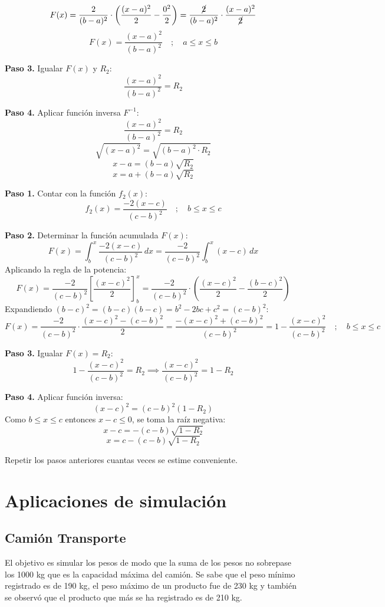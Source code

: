 \documentclass{article}
\begin{document}
\begin{description}
    $$ F(x) = \frac{2}{(b-a)^2} \cdot \left( \frac{(x-a)^2}{2} - \frac{0^2}{2} \right) = \frac{\cancel{2}}{(b-a)^2} \cdot \frac{(x-a)^2}{\cancel{2}} $$
    $$ F(x) = \frac{(x-a)^2}{(b-a)^2} \quad ; \quad a \leq x \leq b $$

    \textbf{Paso 3.} Igualar $F(x)$ y $R_2$:
    $$ \frac{(x-a)^2}{(b-a)^2} = R_2 $$

    \textbf{Paso 4.} Aplicar función inversa $F^{-1}$:
    $$ \frac{(x-a)^2}{(b-a)^2} = R_2 $$
    $$ \sqrt{(x-a)^2} = \sqrt{(b-a)^2 \cdot R_2} $$
    $$ x - a = (b-a)\sqrt{R_2} $$
    $$ \boxed{x = a + (b-a)\sqrt{R_2}} $$

    \textbf{Paso 1.} Contar con la función $f_2(x)$:
    $$ f_2(x) = \frac{-2(x-c)}{(c-b)^2} \quad ; \quad b \leq x \leq c $$

    \textbf{Paso 2.} Determinar la función acumulada $F(x)$:
    $$ F(x) = \int_b^x \frac{-2(x-c)}{(c-b)^2}\,dx = \frac{-2}{(c-b)^2} \int_b^x (x-c)\,dx $$
    Aplicando la regla de la potencia:
    $$ F(x) = \frac{-2}{(c-b)^2} \left[\frac{(x-c)^2}{2}\right]_b^x = \frac{-2}{(c-b)^2} \cdot \left(\frac{(x-c)^2}{2} - \frac{(b-c)^2}{2}\right) $$
    Expandiendo $(b-c)^2 = (b-c)(b-c) = b^2 - 2bc + c^2 = (c-b)^2$:
    $$ F(x) = \frac{-2}{(c-b)^2} \cdot \frac{(x-c)^2-(c-b)^2}{2} = \frac{-(x-c)^2+(c-b)^2}{(c-b)^2} = 1 - \frac{(x-c)^2}{(c-b)^2} \quad ; \quad b \leq x \leq c $$

    \textbf{Paso 3.} Igualar $F(x) = R_2$:
    $$ 1 - \frac{(x-c)^2}{(c-b)^2} = R_2 \implies \frac{(x-c)^2}{(c-b)^2} = 1 - R_2 $$

    \textbf{Paso 4.} Aplicar función inversa:
    $$ (x-c)^2 = (c-b)^2(1-R_2) $$
    Como $b \leq x \leq c$ entonces $x-c \leq 0$, se toma la raíz negativa:
    $$ x-c = -(c-b)\sqrt{1-R_2} $$
    $$ \boxed{x = c-(c-b)\sqrt{1-R_2}} $$
    
    \item[Paso 8:] Repetir los pasos anteriores cuantas veces se 
    estime conveniente.
\end{description}

\section{Aplicaciones de simulación}

\subsection{Camión Transporte}
El objetivo es simular los pesos de modo que la suma de los pesos no sobrepase los
1000 kg que es la capacidad máxima del camión. Se sabe que el peso mínimo registrado
es de 190 kg, el peso máximo de un producto fue de 230 kg y también se observó que el
producto que más se ha registrado es de 210 kg.
\end{document}
